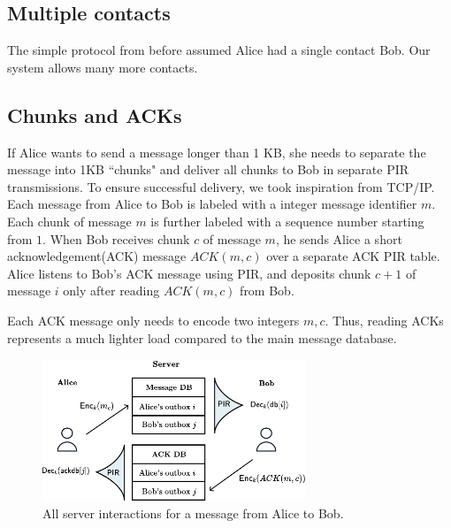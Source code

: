 \subsection{Multiple contacts}

The simple protocol from before assumed Alice had a single contact Bob. Our system allows many more contacts. 

\subsection{Chunks and ACKs}

If Alice wants to send a message longer than 1 KB, she needs to separate the message into 1KB ``chunks" and deliver all chunks to Bob in separate PIR transmissions. To ensure successful delivery, we took inspiration from TCP/IP. Each message from Alice to Bob is labeled with a integer message identifier $m$. Each chunk of message $m$ is further labeled with a sequence number starting from $1$. When Bob receives chunk $c$ of message $m$, he sends Alice a short acknowledgement(ACK) message $ACK(m, c)$ over a separate ACK PIR table. Alice listens to Bob's ACK message using PIR, and deposits chunk $c + 1$ of message $i$ only after reading $ACK(m, c)$ from Bob.

Each ACK message only needs to encode two integers $m, c$. Thus, reading ACKs represents a much lighter load compared to the main message database.


\begin{figure}
    \centering
    \includegraphics[width=0.7\textwidth]{ACK.pdf}
\caption{All server interactions for a message from Alice to Bob. }
\label{fig:highlevelpir}
\end{figure}


